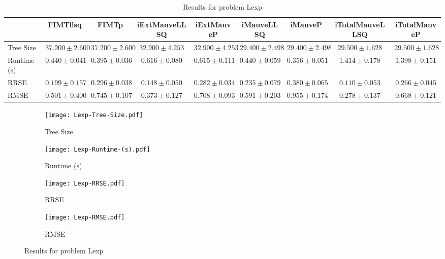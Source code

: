 \documentclass{article}
\begin{document}
\begin{table}[h]
\tiny
\begin{tabular}{|l|c|c|c|c|c|c|c|c|}
\hline
 & FIMTllsq & FIMTp & iExtMauveLLSQ & iExtMauveP & iMauveLLSQ & iMauveP & iTotalMauveLLSQ & iTotalMauveP\\
\hline
Tree Size & $37.200 \pm 2.600$ & $37.200 \pm 2.600$ & $32.900 \pm 4.253$ & $32.900 \pm 4.253$ & \cellcolor{blue!25} $29.400 \pm 2.498$ & \cellcolor{blue!25} $29.400 \pm 2.498$ & $29.500 \pm 1.628$ & $29.500 \pm 1.628$ \\
\hline
Runtime (s) & $0.440 \pm 0.041$ & $0.395 \pm 0.036$ & $0.616 \pm 0.080$ & $0.615 \pm 0.111$ & $0.440 \pm 0.059$ & \cellcolor{blue!25} $0.356 \pm 0.051$ & $1.414 \pm 0.178$ & $1.398 \pm 0.151$ \\
\hline
RRSE & $0.199 \pm 0.157$ & $0.296 \pm 0.038$ & $0.148 \pm 0.050$ & $0.282 \pm 0.034$ & $0.235 \pm 0.079$ & $0.380 \pm 0.065$ & \cellcolor{blue!25} $0.110 \pm 0.053$ & $0.266 \pm 0.045$ \\
\hline
RMSE & $0.501 \pm 0.400$ & $0.745 \pm 0.107$ & $0.373 \pm 0.127$ & $0.708 \pm 0.093$ & $0.591 \pm 0.203$ & $0.955 \pm 0.174$ & \cellcolor{blue!25} $0.278 \pm 0.137$ & $0.668 \pm 0.121$ \\
\hline
\end{tabular}
\caption{Results for problem Lexp}
\end{table}
\begin{figure}[h]
\centering
\begin{subfigure}{0.45\textwidth}
  \texttt{[image: Lexp-Tree-Size.pdf]}
  \caption{Tree Size}
\end{subfigure}
\begin{subfigure}{0.45\textwidth}
  \texttt{[image: Lexp-Runtime-(s).pdf]}
  \caption{Runtime (s)}
\end{subfigure}
\begin{subfigure}{0.45\textwidth}
  \texttt{[image: Lexp-RRSE.pdf]}
  \caption{RRSE}
\end{subfigure}
\begin{subfigure}{0.45\textwidth}
  \texttt{[image: Lexp-RMSE.pdf]}
  \caption{RMSE}
\end{subfigure}
\caption{Results for problem Lexp}
\end{figure}
\end{document}
